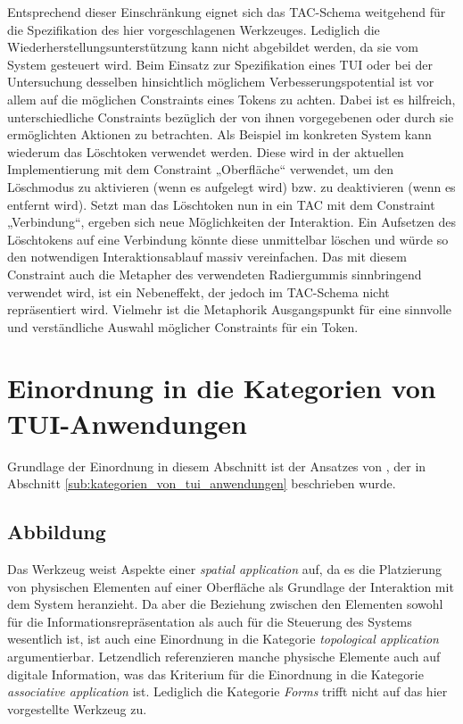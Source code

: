 Entsprechend dieser Einschränkung eignet sich das \gls{TAC}-Schema weitgehend für die Spezifikation des hier vorgeschlagenen Werkzeuges. Lediglich die Wiederherstellungsunterstützung kann nicht abgebildet werden, da sie vom System gesteuert wird. Beim Einsatz zur Spezifikation eines \gls{TUI} oder bei der Untersuchung desselben hinsichtlich möglichem Verbesserungspotential ist vor allem auf die möglichen Constraints eines Tokens zu achten. Dabei ist es hilfreich, unterschiedliche Constraints bezüglich der von ihnen vorgegebenen oder durch sie ermöglichten Aktionen zu betrachten. Als Beispiel im konkreten System kann wiederum das Löschtoken verwendet werden. Diese wird in der aktuellen Implementierung mit dem Constraint „Oberfläche“ verwendet, um den Löschmodus zu aktivieren (wenn es aufgelegt wird) bzw. zu deaktivieren (wenn es entfernt wird). Setzt man das Löschtoken nun in ein \gls{TAC} mit dem Constraint „Verbindung“, ergeben sich neue Möglichkeiten der Interaktion. Ein Aufsetzen des Löschtokens auf eine Verbindung könnte diese unmittelbar löschen und würde so den notwendigen Interaktionsablauf massiv vereinfachen. Das mit diesem Constraint auch die Metapher des verwendeten Radiergummis sinnbringend verwendet wird, ist ein Nebeneffekt, der jedoch im \gls{TAC}-Schema nicht repräsentiert wird. Vielmehr ist die Metaphorik Ausgangspunkt für eine sinnvolle und verständliche Auswahl möglicher Constraints für ein Token.


\section{Einordnung in die Kategorien von TUI-Anwendungen} %
\label{sec:einordnung_in_die_kategorien_von_tui_anwendungen}

Grundlage der Einordnung in diesem Abschnitt ist der Ansatzes von \citep{Klemmer04}, der in Abschnitt \ref{sub:kategorien_von_tui_anwendungen} beschrieben wurde.

\subsection{Abbildung}

Das Werkzeug weist Aspekte einer \emph{spatial application} auf, da es die Platzierung von physischen Elementen auf einer Oberfläche als Grundlage der Interaktion mit dem System heranzieht. Da aber die Beziehung zwischen den Elementen sowohl für die Informationsrepräsentation als auch für die Steuerung des Systems wesentlich ist, ist auch eine Einordnung in die Kategorie \emph{topological application} argumentierbar. Letzendlich referenzieren manche physische Elemente auch auf digitale Information, was das Kriterium für die Einordnung in die Kategorie \emph{associative application} ist. Lediglich die Kategorie \emph{Forms} trifft nicht auf das hier vorgestellte Werkzeug zu. 

